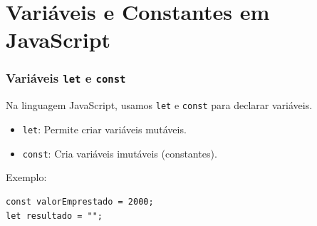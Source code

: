 \documentclass[13pt, xcolor={dvipsnames,svgnames}, portuguese]{beamer}
\begin{document}
\section{Variáveis e Constantes em JavaScript}
\begin{frame}[fragile]
\frametitle{Variáveis \texttt{let} e \texttt{const}}

Na linguagem JavaScript, usamos \texttt{let} e \texttt{const} para declarar variáveis.

\begin{itemize}
  \item \texttt{let}: Permite criar variáveis mutáveis.
  \item \texttt{const}: Cria variáveis imutáveis (constantes).
\end{itemize}

Exemplo:
\begin{verbatim}
const valorEmprestado = 2000;
let resultado = "";
\end{verbatim}

\end{frame}

\end{document}
